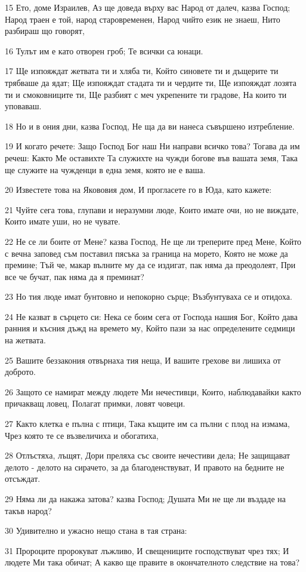 \par 15 Ето, доме Израилев, Аз ще доведа върху вас Народ от далеч, казва Господ; Народ траен е той, народ старовременен, Народ чийто език не знаеш, Нито разбираш що говорят,
\par 16 Тулът им е като отворен гроб; Те всички са юнаци.
\par 17 Ще изпояждат жетвата ти и хляба ти, Който синовете ти и дъщерите ти трябваше да ядат; Ще изпояждат стадата ти и чердите ти, Ще изпояждат лозята ти и смоковниците ти, Ще разбият с меч укрепените ти градове, На които ти уповаваш.
\par 18 Но и в ония дни, казва Господ, Не ща да ви нанеса съвършено изтребление.
\par 19 И когато речете: Защо Господ Бог наш Ни направи всичко това? Тогава да им речеш: Както Ме оставихте Та служихте на чужди богове във вашата земя, Така ще служите на чужденци в една земя, която не е ваша.
\par 20 Известете това на Якововия дом, И прогласете го в Юда, като кажете:
\par 21 Чуйте сега това, глупави и неразумни люде, Които имате очи, но не виждате, Които имате уши, но не чувате.
\par 22 Не се ли боите от Мене? казва Господ, Не ще ли треперите пред Мене, Който с вечна заповед съм поставил пясъка за граница на морето, Която не може да премине; Тъй че, макар вълните му да се издигат, пак няма да преодолеят, При все че бучат, пак няма да я преминат?
\par 23 Но тия люде имат бунтовно и непокорно сърце; Възбунтуваха се и отидоха.
\par 24 Не казват в сърцето си: Нека се боим сега от Господа нашия Бог, Който дава ранния и късния дъжд на времето му, Който пази за нас определените седмици на жетвата.
\par 25 Вашите беззакония отвърнаха тия неща, И вашите грехове ви лишиха от доброто.
\par 26 Защото се намират между людете Ми нечестивци, Които, наблюдавайки както причакващ ловец, Полагат примки, ловят човеци.
\par 27 Както клетка е пълна с птици, Така къщите им са пълни с плод на измама, Чрез която те се възвеличиха и обогатиха,
\par 28 Отлъстяха, лъщят, Дори преляха със своите нечестиви дела; Не защищават делото - делото на сирачето, за да благоденствуват, И правото на бедните не отсъждат.
\par 29 Няма ли да накажа затова? казва Господ; Душата Ми не ще ли въздаде на такъв народ?
\par 30 Удивително и ужасно нещо стана в тая страна:
\par 31 Пророците пророкуват лъжливо, И свещениците господствуват чрез тях; И людете Ми така обичат; А какво ще правите в окончателното следствие на това?

